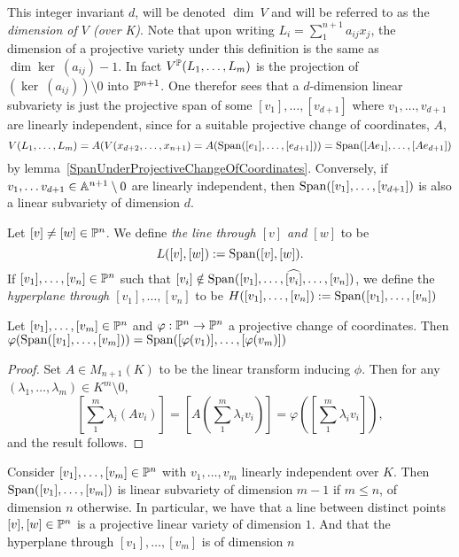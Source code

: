     \begin{remark}
        This integer invariant $d$, will be denoted $\dim \ V$ and will be referred to as the \textit{dimension of $V$ (over K)}. Note that upon writing $L_i = \sum_1^{n+1} a_{ij} x_j$, the dimension of a projective variety under this definition is the same as $\dim \ker \ (a_{ij})-1$. In fact $V^{\mathbb{P}}(L_1,\dots,L_m)$ is the projection of $(\ker\ (a_{ij}))\setminus 0$ into $\mathbb{P}^{n+1}$. One therefor sees that a $d$-dimension linear subvariety is just the projective span of some $[v_1],\dots,[v_{d+1}]$ where $v_1,\dots,v_{d+1}$ are linearly independent, since for a suitable projective change of coordinates, $A$,
        $$V(L_1,\dots,L_m)=A(V(x_{d+2},\dots,x_{n+1})=A(\mathrm{Span}([e_1],\dots,[e_{d+1}]))=\mathrm{Span}([Ae_1],\dots,[Ae_{d+1}])$$
        by lemma~\ref{SpanUnderProjectiveChangeOfCoordinates}. Conversely, if $v_1,\dots v_{d+1}\in\mathbb{A}^{n+1}\setminus 0$ are linearly independent, then $\mathrm{Span}([v_1],\dots,[v_{d+1}])$ is also a linear subvariety of dimension $d$.
    \end{remark}
    \begin{definition}
        Let $[v]\neq [w]\in \mathbb{P}^n$. We define \textit{the line through $[v]$ and $[w]$} to be 
        $$L([v],[w]):= \mathrm{Span}([v],[w]).$$
        If $[v_1],\dots,[v_n]\in \mathbb{P}^n$ such that $[v_i]\notin \mathrm{Span}([v_1],\dots, \widehat{[v_i]},\dots,[v_n])$, we define the \textit{hyperplane through $[v_1],\dots,[v_n]$} to be  
        $H([v_1],\dots,[v_n]):= \mathrm{Span}([v_1],\dots,[v_n])$
    \end{definition}
    \begin{lemma}\label{SpanUnderProjectiveChangeOfCoordinates}
        Let $[v_1],\dots, [v_m]\in \mathbb{P}^n$ and $\varphi: \mathbb{P}^n \rightarrow \mathbb{P}^n$ a projective change of coordinates. Then 
        $\varphi(\mathrm{Span}([v_1],\dots,[v_m]))=\mathrm{Span}([\varphi(v_1)],\dots,[\varphi(v_m)])$
    \end{lemma}
    \begin{proof}
        Set $A\in M_{n+1}(K)$ to be the linear transform inducing $\phi$. Then for any $(\lambda_1,\dots,\lambda_m)\in K^m\setminus 0$, 
        $$\left[\sum_1^m \lambda_i(Av_i)\right] = \left[A\left(\sum_1^m\lambda_iv_i\right)\right]=\varphi\left(\left[\sum_1^m\lambda_i v_i\right]\right),$$
        and the result follows. 
    \end{proof}
    \begin{lemma}
        Consider $[v_1],\dots,[v_m]\in \mathbb{P}^n$ with $v_1,\dots,v_m$ linearly independent over $K$. Then $\mathrm{Span}([v_1],\dots,[v_m])$ is linear subvariety of dimension $m-1$ if $m \leq n$, of dimension $n$ otherwise. In particular, we have that a line between distinct points $[v],[w]\in \mathbb{P}^n$ is a projective linear variety of dimension $1$. And that the hyperplane through $[v_1],\dots,[v_m]$ is of dimension $n$
    \end{lemma}
